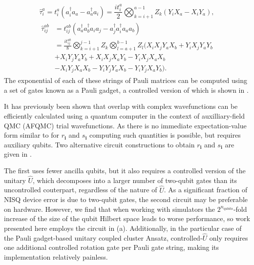 \documentclass[%
 reprint,
 amsmath,amssymb,
 aps,
]{revtex4-2}
\begin{document}
\begin{equation}
\hat \tau_{i}^{a} = t_i^{a}(a^\dagger_i a_a - a^\dagger_a a_i) = \frac{it_{i}^{a}}{2} \bigotimes_{k=i+1}^{a-1} Z_k(Y_iX_a - X_iY_a),
\end{equation}
\begin{align}
\begin{split}
\hat \tau_{ij}^{ab} &= t_{ij}^{ab}(a^\dagger_a a^\dagger_b a_i a_j - a^\dagger_j a^\dagger_i a_a a_b)  \\
 &=\frac{it_{ij}^{ab}}{8}  \bigotimes_{k=i+1}^{j-1} Z_k  \bigotimes_{l=a+1}^{b-1} Z_l (X_i X_j Y_a X_b + Y_i X_j Y_a Y_b \\
 &+X_i Y_j Y_a Y_b + X_i X_j X_a Y_b  - Y_i X_j X_a X_b \\
 &- X_i Y_j X_a X_b - Y_i Y_j Y_a X_b - Y_i Y_j X_a Y_b).
\end{split}
\end{align}
The exponential of each of these strings of Pauli matrices can be computed using a set of gates known as a Pauli gadget,\cite{Cowtan2020} a controlled version of which is shown in .

It has previously been shown that overlap with complex wavefunctions can be efficiently calculated using a quantum computer\cite{Huggins2022} in the context of auxilliary-field QMC (AFQMC)\cite{Zhang2003} trial wavefunctions. As there is no immediate expectation-value form similar to  for $r_\mathbf{i}$ and $s_\mathbf{i}$ computing such quantities is possible, but requires auxiliary qubits. Two alternative circuit constructions to obtain $r_\mathbf{i}$ and $s_\mathbf{i}$ are given in . 

The first uses fewer ancilla qubits, but it also requires a controlled version of the unitary $\hat U$, which decomposes into a larger number of two-qubit gates than its uncontrolled couterpart, regardless of the nature of $\hat U$. As a significant fraction of NISQ device error is due to two-qubit gates, the second circuit may be preferable on hardware. However, we find that when working with simulators the $2^{n_\mathrm{qubits}}$-fold increase of the size of the qubit Hilbert space leads to worse performance, so work presented here employs the circuit in  (a). 
 Additionally, in the particular case of the Pauli gadget-based unitary coupled cluster Ansatz, controlled-$\hat U$ only requires one additional controlled rotation gate per Pauli gate string, making its implementation relatively painless.
\end{document}
